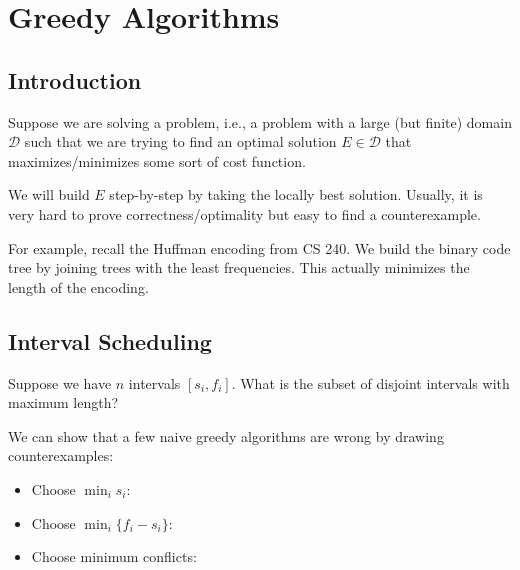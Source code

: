 \chapter{Greedy Algorithms}

\section{Introduction}

Suppose we are solving a  problem,
i.e., a problem with a large (but finite) domain $\mathcal D$
such that we are trying to find an optimal solution $E \in \mathcal D$
that maximizes/minimizes some sort of cost function.

We will build $E$ step-by-step by taking the locally best solution.
Usually, it is very hard to prove correctness/optimality
but easy to find a counterexample.

For example, recall the Huffman encoding from CS 240.
We build the binary code tree by joining trees with the least frequencies.
This actually minimizes the length of the encoding.

\section{Interval Scheduling}

\begin{problem}
  Suppose we have $n$ intervals $[s_i, f_i]$.
  What is the subset of disjoint intervals with maximum length?
\end{problem}

We can show that a few naive greedy algorithms are wrong by drawing counterexamples:
\begin{itemize}
  \item Choose $\min_i s_i$: 
  \item Choose $\min_i\{f_i - s_i\}$: 
  \item Choose minimum conflicts:
\end{itemize}

